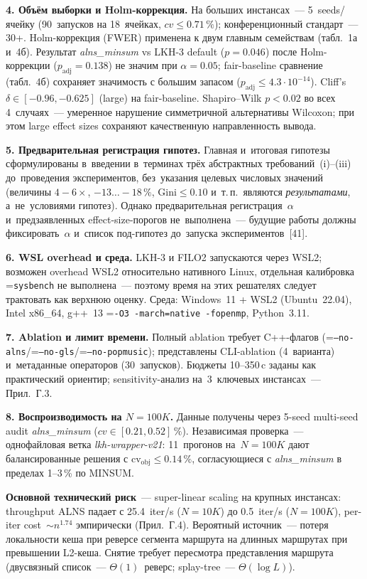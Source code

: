 \documentclass[a4paper,14pt]{extreport}
\makeatletter
\let\old@texttt\texttt
\renewcommand{\texttt}[1]{{\sloppy\hyphenchar\font=\m@ne\old@texttt{#1}}}
\makeatother
\begin{document}
\textbf{4. Объём выборки и Holm-коррекция.} На больших инстансах~--- 5~seeds/ячейку (90~запусков на 18~ячейках, $cv\leq 0.71\,\%$); конференционный стандарт~--- 30+. Holm-коррекция (FWER) применена к двум главным семействам (табл.~1а и~4б). Результат \emph{alns\_minsum} vs LKH-3 default ($p=0.046$) после Holm-коррекции ($p_\mathrm{adj}=0.138$) не значим при $\alpha=0.05$; fair-baseline сравнение (табл.~4б) сохраняет значимость с большим запасом ($p_\mathrm{adj}\leq 4.3{\cdot}10^{-14}$). Cliff's~$\delta\in[-0.96,-0.625]$ (large) на fair-baseline. Shapiro--Wilk $p<0.02$ во всех 4~случаях~--- умеренное нарушение симметричной альтернативы Wilcoxon; при этом large effect sizes сохраняют качественную направленность вывода.

\textbf{5. Предварительная регистрация гипотез.} Главная и~итоговая гипотезы сформулированы в~введении в~терминах трёх абстрактных требований~(i)--(iii) до~проведения экспериментов, без~указания целевых числовых значений (величины $4{-}6\times$, $-13\dots-18\,\%$, $\mathrm{Gini}\leq 0.10$ и~т.\,п.\ являются \emph{результатами}, а~не~условиями гипотез). Однако предварительная регистрация~$\alpha$ и~предзаявленных effect-size-порогов не~выполнена~--- будущие работы должны фиксировать~$\alpha$ и~список под-гипотез до~запуска экспериментов~[41].

\textbf{6. WSL overhead и среда.} LKH-3 и FILO2 запускаются через WSL2; возможен overhead WSL2 относительно нативного Linux, отдельная калибровка \texttt{sysbench} не выполнена~--- поэтому время на этих решателях следует трактовать как верхнюю оценку. Среда: Windows~11 + WSL2 (Ubuntu~22.04), Intel x86\_64, g++~13 \texttt{-O3 -march=native -fopenmp}, Python~3.11.

\textbf{7. Ablation и лимит времени.} Полный ablation требует C++-флагов (\texttt{--no-alns}/\texttt{--no-gls}/\texttt{--no-popmusic}); представлены CLI-ablation (4~варианта) и~метаданные операторов (30~запусков). Бюджеты 10--350\,c заданы как практический ориентир; sensitivity-анализ на~3~ключевых инстансах~--- Прил.~Г.3.

\textbf{8. Воспроизводимость на $N=100K$.} Данные получены через 5-seed multi-seed audit \emph{alns\_minsum} ($cv\in[0.21,0.52]\,\%$). Независимая проверка~--- однофайловая ветка \emph{lkh-wrapper-v21}: 11~прогонов на~$N=100K$ дают балансированные решения с $\mathrm{cv}_\text{obj}\leq 0.14\,\%$, согласующиеся с \emph{alns\_minsum} в пределах 1--3\,\% по MINSUM.

\medskip
\textbf{Основной технический риск}~--- super-linear scaling на крупных инстансах: throughput ALNS падает с 25.4~iter/s ($N=10K$) до 0.5~iter/s ($N=100K$), per-iter cost~$\sim n^{1.74}$ эмпирически (Прил.~Г.4). Вероятный источник~--- потеря локальности кеша при реверсе сегмента маршрута на длинных маршрутах при превышении L2-кеша. Снятие требует пересмотра представления маршрута (двусвязный список~--- $\Theta(1)$~реверс; splay-tree~--- $\Theta(\log L)$).
\end{document}
